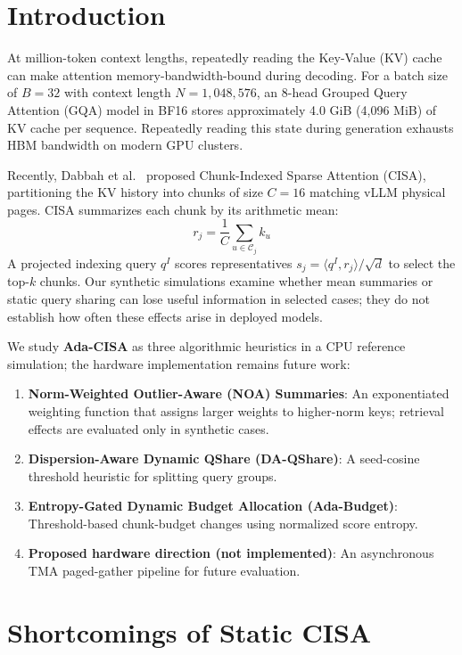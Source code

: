 \documentclass[10pt,twocolumn]{article}
\begin{document}
\section{Introduction}
At million-token context lengths, repeatedly reading the Key-Value (KV) cache can make attention memory-bandwidth-bound during decoding. For a batch size of $B=32$ with context length $N=1,048,576$, an 8-head Grouped Query Attention (GQA) model in BF16 stores approximately 4.0 GiB (4,096 MiB) of KV cache per sequence. Repeatedly reading this state during generation exhausts HBM bandwidth on modern GPU clusters.

Recently, Dabbah et al.~\cite{cisa2026} proposed Chunk-Indexed Sparse Attention (CISA), partitioning the KV history into chunks of size $C=16$ matching vLLM physical pages. CISA summarizes each chunk by its arithmetic mean:
\begin{equation}
r_j = \frac{1}{C}\sum_{u \in \mathcal{C}_j} k_u
\end{equation}
A projected indexing query $q^I$ scores representatives $s_j = \langle q^I, r_j \rangle / \sqrt{d}$ to select the top-$k$ chunks. Our synthetic simulations examine whether mean summaries or static query sharing can lose useful information in selected cases; they do not establish how often these effects arise in deployed models.

We study \textbf{Ada-CISA} as three algorithmic heuristics in a CPU reference simulation; the hardware implementation remains future work:
\begin{enumerate}
    \item \textbf{Norm-Weighted Outlier-Aware (NOA) Summaries}: An exponentiated weighting function that assigns larger weights to higher-norm keys; retrieval effects are evaluated only in synthetic cases.
    \item \textbf{Dispersion-Aware Dynamic QShare (DA-QShare)}: A seed-cosine threshold heuristic for splitting query groups.
    \item \textbf{Entropy-Gated Dynamic Budget Allocation (Ada-Budget)}: Threshold-based chunk-budget changes using normalized score entropy.
    \item \textbf{Proposed hardware direction (not implemented)}: An asynchronous TMA paged-gather pipeline for future evaluation.
\end{enumerate}

\section{Shortcomings of Static CISA}
\end{document}
